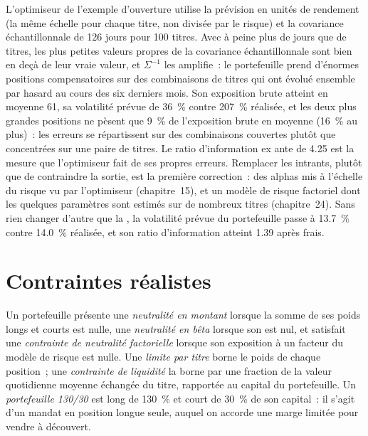 L'optimiseur de l'exemple d'ouverture utilise la prévision en unités de rendement (la même échelle pour chaque titre, non divisée par le risque) et la covariance échantillonnale de 126 jours pour 100
titres. Avec à peine plus de jours que de titres, les plus petites valeurs propres de la covariance échantillonnale sont bien en deçà de leur vraie valeur, et $\Sigma^{-1}$ les amplifie~: le
portefeuille prend d'énormes positions compensatoires sur des combinaisons de titres qui ont évolué ensemble par hasard au cours des six derniers mois. Son exposition brute atteint en moyenne 61, sa
volatilité prévue de 36~\% contre 207~\% réalisée, et les deux plus grandes positions ne pèsent que 9~\% de l'exposition brute en moyenne (16~\% au plus)~: les erreurs se répartissent sur
des combinaisons couvertes plutôt que concentrées sur une paire de titres. Le ratio d'information ex ante de 4.25 est la mesure que l'optimiseur fait de ses propres erreurs. Remplacer
les intrants, plutôt que de contraindre la sortie, est la première correction~: des alphas mis à l'échelle du risque vu par l'optimiseur (chapitre~15), et un modèle de risque factoriel dont les quelques
paramètres sont estimés sur de nombreux titres (chapitre~24). Sans rien changer d'autre que la , la volatilité prévue du portefeuille passe à 13.7~\% contre
14.0~\% réalisée, et son ratio d'information atteint 1.39 après frais.

\section{Contraintes réalistes}

\begin{definition}\label{def:rs:portfolio-construction-i:constraints}
Un portefeuille présente une \emph{neutralité en montant} lorsque la somme de ses poids longs et courts est nulle, une \emph{neutralité en bêta} lorsque son
 est nul, et satisfait une \emph{contrainte de neutralité factorielle} lorsque son exposition à un facteur du modèle de risque est nulle. Une
\emph{limite par titre} borne le poids de chaque position~; une \emph{contrainte de liquidité} la borne par une fraction de la
valeur quotidienne moyenne échangée du titre, rapportée au capital du portefeuille. Un \emph{portefeuille 130/30} est long de 130~\% et court de 30~\% de son capital~:
il s'agit d'un mandat en position longue seule, auquel on accorde une marge limitée pour vendre à découvert.
\end{definition}

